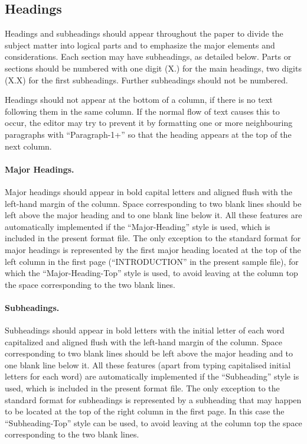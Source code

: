\documentclass{stabs2021}
\begin{document}
\subsection{Headings}

Headings and subheadings should appear throughout the paper to divide
the subject matter into logical parts and to emphasize the major
elements and considerations. Each section may have subheadings, as
detailed below. Parts or sections should be numbered with one digit
(X.) for the main headings, two digits (X.X) for the first
subheadings. Further subheadings should not be numbered.

Headings should not appear at the bottom of a column, if there is no
text following them in the same column. If the normal flow of text
causes this to occur, the editor may try to prevent it by formatting
one or more neighbouring paragraphs with ``Paragraph-1+'' so that the
heading appears at the top of the next column.

\paragraph{Major Headings.}

Major headings should appear in bold capital letters and aligned flush
with the left-hand margin of the column. Space corresponding to two
blank lines should be left above the major heading and to one blank
line below it. All these features are automatically implemented if the
``Major-Heading'' style is used, which is included in the present
format file. The only exception to the standard format for major
headings is represented by the first major heading located at the top
of the left column in the first page (``INTRODUCTION'' in the present
sample file), for which the ``Major-Heading-Top'' style is used, to
avoid leaving at the column top the space corresponding to the two
blank lines.

\paragraph{Subheadings.}

Subheadings should appear in bold letters with the initial letter of
each word capitalized and aligned flush with the left-hand margin of
the column. Space corresponding to two blank lines should be left
above the major heading and to one blank line below it. All these
features (apart from typing capitalised initial letters for each word)
are automatically implemented if the ``Subheading'' style is used,
which is included in the present format file. The only exception to
the standard format for subheadings is represented by a subheading
that may happen to be located at the top of the right column in the
first page. In this case the ``Subheading-Top'' style can be used, to
avoid leaving at the column top the space corresponding to the two
blank lines.
\end{document}
